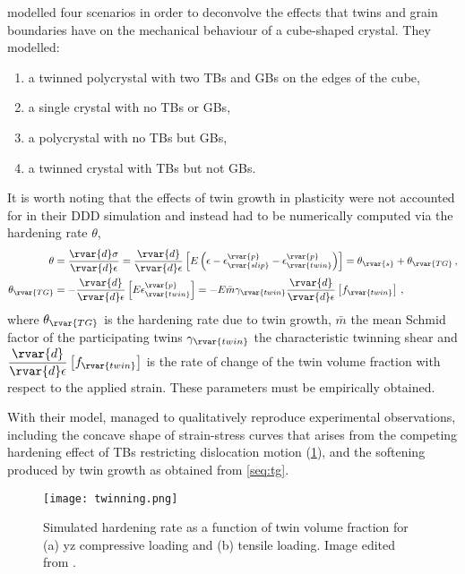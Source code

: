  modelled four scenarios in order to deconvolve the effects that twins and grain boundaries have on the mechanical behaviour of a cube-shaped crystal. They modelled:
\begin{enumerate}
  \item a twinned polycrystal with two TBs and GBs on the edges of the cube,
  \item a single crystal with no TBs or GBs,
  \item a polycrystal with no TBs but GBs,
  \item a twinned crystal with TBs but not GBs.
\end{enumerate}
It is worth noting that the effects of twin growth in plasticity were not accounted for in their DDD simulation and instead had to be numerically computed via the hardening rate $ \theta $,
\begin{subequations}
  \begin{align}
    \theta             & = \dfrac{\rvar{d}\sigma}{\rvar{d}\epsilon} = \dfrac{\rvar{d}}{\rvar{d}\epsilon}  \left[E\left(\epsilon - \epsilon_{\rvar{slip}}^{\rvar{p}} - \epsilon_{\rvar{twin}}^{\rvar{p}}\right)\right] = \theta_{\rvar{s}} + \theta_{\rvar{TG}}\,, \\
    \theta_{\rvar{TG}} & = -\dfrac{\rvar{d}}{\rvar{d}\epsilon} \left[E \epsilon_{\rvar{twin}}^{\rvar{p}} \right] = -E \bar{m} \gamma_{\rvar{twin}} \dfrac{\rvar{d}}{\rvar{d} \epsilon} \left[f_{\rvar{twin}}\right]\label{seq:tg}\,,
  \end{align}
\end{subequations}
where $ \theta_{\rvar{TG}} $ is the hardening rate due to twin growth, $ \bar{m} $ the mean Schmid factor of the participating twins $ \gamma_{\rvar{twin}} $ the characteristic twinning shear and $ \dfrac{\rvar{d}}{\rvar{d} \epsilon} \left[f_{\rvar{twin}}\right] $ is the rate of change of the twin volume fraction with respect to the applied strain. These parameters must be empirically obtained.

With their model, \citet{twinning} managed to qualitatively reproduce experimental observations, including the concave shape of strain-stress curves that arises from the competing hardening effect of TBs restricting dislocation motion (\cref{f:twinning}), and the softening produced by twin growth as obtained from \cref{seq:tg}.
\begin{figure}[t]
  \centering
  \texttt{[image: twinning.png]}
  \caption[Modelling twinned multicrystals with DDD.]{Simulated hardening rate as a function of twin volume fraction for (a) yz compressive loading and (b) tensile loading. Image edited from \cite{twinning}.}
  \label{f:twinning}
\end{figure}

